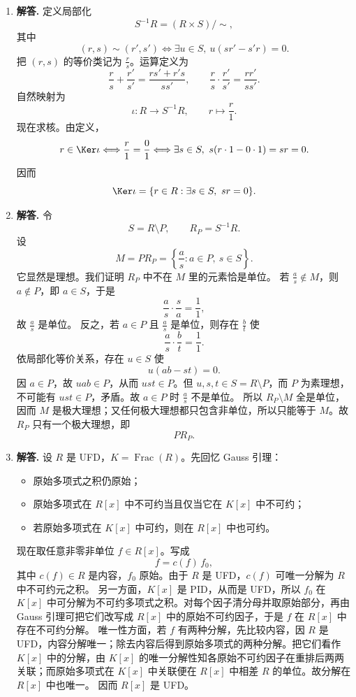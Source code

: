 \begin{enumerate}[label=\textbf{\arabic*.}, leftmargin=*, itemsep=1em]
  \item \textbf{解答.} 定义局部化
  \[
  S^{-1}R=(R\times S)/\sim,
  \]
  其中
  \[
  (r,s)\sim (r',s')\Longleftrightarrow \exists u\in S,\ u(sr'-s'r)=0.
  \]
  把 $(r,s)$ 的等价类记为 $\frac rs$。运算定义为
  \[
  \frac rs+\frac{r'}{s'}=\frac{rs'+r's}{ss'},\qquad
  \frac rs\cdot\frac{r'}{s'}=\frac{rr'}{ss'}.
  \]
  自然映射为
  \[
  \iota:R\to S^{-1}R,\qquad r\mapsto \frac r1.
  \]
  现在求核。由定义，
  \[
  r\in\Ker\iota \Longleftrightarrow \frac r1=\frac01
  \Longleftrightarrow \exists s\in S,\ s(r\cdot1-0\cdot1)=sr=0.
  \]
  因而
  \[
  \Ker\iota=\{r\in R:\exists s\in S,\ sr=0\}.
  \]

  \item \textbf{解答.} 令
  \[
  S=R\setminus P,\qquad R_P=S^{-1}R.
  \]
  设
  \[
  M=PR_P=\left\{\frac a s:a\in P,\ s\in S\right\}.
  \]
  它显然是理想。我们证明 $R_P$ 中不在 $M$ 里的元素恰是单位。  
  若 $\frac a s\notin M$，则 $a\notin P$，即 $a\in S$，于是
  \[
  \frac a s\cdot \frac s a=\frac11,
  \]
  故 $\frac a s$ 是单位。  
  反之，若 $a\in P$ 且 $\frac a s$ 是单位，则存在 $\frac bt$ 使
  \[
  \frac a s\cdot\frac bt=\frac11.
  \]
  依局部化等价关系，存在 $u\in S$ 使
  \[
  u(ab-st)=0.
  \]
  因 $a\in P$，故 $uab\in P$，从而 $ust\in P$。但 $u,s,t\in S=R\setminus P$，而 $P$ 为素理想，不可能有 $ust\in P$，矛盾。故 $a\in P$ 时 $\frac a s$ 不是单位。  
  所以 $R_P\setminus M$ 全是单位，因而 $M$ 是极大理想；又任何极大理想都只包含非单位，所以只能等于 $M$。故 $R_P$ 只有一个极大理想，即
  \[
  PR_P.
  \]

  \item \textbf{解答.} 设 $R$ 是 UFD，$K=\operatorname{Frac}(R)$。先回忆 Gauss 引理：  
  \begin{itemize}
    \item 原始多项式之积仍原始；
    \item 原始多项式在 $R[x]$ 中不可约当且仅当它在 $K[x]$ 中不可约；
    \item 若原始多项式在 $K[x]$ 中可约，则在 $R[x]$ 中也可约。
  \end{itemize}
  现在取任意非零非单位 $f\in R[x]$。写成
  \[
  f=c(f)\,f_0,
  \]
  其中 $c(f)\in R$ 是内容，$f_0$ 原始。由于 $R$ 是 UFD，$c(f)$ 可唯一分解为 $R$ 中不可约元之积。  
  另一方面，$K[x]$ 是 PID，从而是 UFD，所以 $f_0$ 在 $K[x]$ 中可分解为不可约多项式之积。对每个因子清分母并取原始部分，再由 Gauss 引理可把它们改写成 $R[x]$ 中的原始不可约因子，于是 $f$ 在 $R[x]$ 中存在不可约分解。  
  唯一性方面，若 $f$ 有两种分解，先比较内容，因 $R$ 是 UFD，内容分解唯一；除去内容后得到原始多项式的两种分解。把它们看作 $K[x]$ 中的分解，由 $K[x]$ 的唯一分解性知各原始不可约因子在重排后两两关联；而原始多项式在 $K[x]$ 中关联便在 $R[x]$ 中相差 $R$ 的单位。故分解在 $R[x]$ 中也唯一。  
  因而 $R[x]$ 是 UFD。


\end{enumerate}
